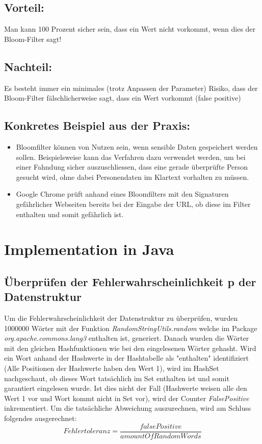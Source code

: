 \documentclass[16 pt]{article}
\begin{document}
\subsection{Vorteil:}
Man kann 100 Prozent sicher sein, dass ein Wert nicht vorkommt, wenn dies der Bloom-Filter sagt!
\subsection{Nachteil:}
Es besteht immer ein minimales (trotz Anpassen der Parameter) Risiko, dass der Bloom-Filter fälschlicherweise sagt, dass ein Wert vorkommt (false positive)
\subsection{Konkretes Beispiel aus der Praxis: }
\begin{itemize}
    \item{Bloomfilter können von Nutzen sein, wenn sensible Daten gespeichert werden sollen. Beispielsweise kann das Verfahren dazu verwendet werden, um bei einer Fahndung sicher auszuschliessen, dass eine gerade überprüfte Person gesucht wird, ohne dabei Personendaten im Klartext vorhalten zu müssen.}
    \item{Google Chrome prüft anhand eines Bloomfilters mit den Signaturen gefährlicher Webseiten bereits bei der Eingabe der URL, ob diese im Filter enthalten und somit gefährlich ist.}
\end{itemize}
\pagebreak
\section{Implementation in Java}
\subsection{Überprüfen der Fehlerwahrscheinlichkeit p der Datenstruktur}
Um die Fehlerwahrscheinlichkeit der Datenstruktur zu überprüfen, wurden 1000000 Wörter mit der Funktion \emph{RandomStringUtils.random} welche im Package \emph{org.apache.commons.lang3} enthalten ist, generiert. Danach wurden die Wörter mit den gleichen Hashfunktionen wie bei den eingelesenen Wörter gehasht. Wird ein Wort anhand der Hashwerte in der Hashtabelle  als "enthalten" identifiziert (Alle Positionen der Hashwerte haben den Wert 1), wird im HashSet nachgeschaut, ob dieses Wort tatsächlich im Set enthalten ist und somit garantiert eingelesen wurde. Ist dies nicht der Fall (Hashwerte weisen alle den Wert 1 vor und Wort kommt nicht in Set vor), wird der Counter \emph{FalsePositive} inkrementiert.
Um die tatsächliche Abweichung auszurechnen, wird am Schluss folgendes ausgerechnet:
\[
    \boxed{Fehlertoleranz = \frac{falsePositive}{amountOfRandomWords}}
    \] \\
\end{document}
